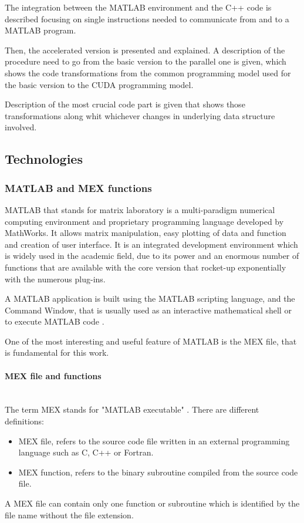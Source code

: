 \documentclass[12pt,a4paper]{extarticle}
\newcommand{\linespace}{\vspace{0pt}}
\newcommand{\myparagraph}[1]{\paragraph{#1}\mbox{}\\}
\begin{document}
The integration between the MATLAB environment and the C++ code is described focusing on single instructions needed to communicate from and to a MATLAB program.
\linespace

Then, the accelerated version is presented and explained. A description of the procedure need to go from the basic version to the parallel one is given, which shows the code transformations from the common programming model used for the basic version to the CUDA programming model. 

Description of the most crucial code part is given that shows those transformations along whit whichever changes in underlying data structure involved.

\subsection{Technologies} 
\subsubsection{MATLAB and MEX functions}
MATLAB that stands for matrix laboratory is a multi-paradigm numerical computing environment and proprietary programming language developed by MathWorks. It allows matrix manipulation, easy plotting of data and function and creation of user interface.
It is an integrated development environment which is widely used in the academic field, due to its power and an enormous number of functions that are available with the core version that rocket-up exponentially with the numerous plug-ins.

A MATLAB application is built using the MATLAB scripting language, and the Command Window, that is usually used as an interactive mathematical shell or to execute MATLAB code \cite{wiki_mat}.
\linespace

One of the most interesting and useful feature of MATLAB is the MEX file, that is fundamental for this work.
\myparagraph{MEX file and functions} The term MEX stands for "MATLAB executable" \cite{matlab_mex}.  
There are different definitions:
\begin{itemize}
\item MEX file, refers to the source code file written in an external programming language such as C, C++ or Fortran.
\item MEX function, refers to the binary subroutine compiled from the source code file.
\end{itemize}

A MEX file can contain only one function or subroutine which is identified by the file name without the file extension.
\end{document}
